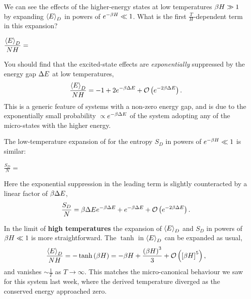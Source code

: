 \newpage %
We can see the effects of the higher-energy states at low temperatures $\beta H \gg 1$ by expanding $\left\langle E \right\rangle_D$ in powers of $e^{-\beta H} \ll 1$.
What is the first $\frac{T}{H}$-dependent term in this expansion?
\begin{mdframed}
  $\displaystyle \frac{\left\langle E \right\rangle_D}{NH} = $ \\[100 pt]
\end{mdframed}
You should find that the excited-state effects are \textit{exponentially} suppressed by the energy gap $\Delta E$ at low temperatures,
\begin{equation*}
  \frac{\left\langle E \right\rangle_D}{NH} = -1 + 2e^{-\beta \Delta E} + \mathcal O\left(e^{-2\beta \Delta E}\right).
\end{equation*}
This is a generic feature of systems with a non-zero energy gap, and is due to the exponentially small probability $\propto$$e^{-\beta \Delta E}$ of the system adopting any of the micro-states with the higher energy.

The low-temperature expansion of  for the entropy $S_D$ in powers of $e^{-\beta H} \ll 1$ is similar:
\begin{mdframed}
  $\displaystyle \frac{S_D}{N} = $ \\[100 pt]
\end{mdframed}
Here the exponential suppression in the leading term is slightly counteracted by a linear factor of $\beta \Delta E$,
\begin{equation*}
  \frac{S_D}{N} = \beta \Delta E e^{-\beta \Delta E} + e^{-\beta \Delta E} + \mathcal O\left(e^{-2\beta \Delta E}\right).
\end{equation*}

In the limit of \textbf{high temperatures} the expansion of $\left\langle E \right\rangle_D$ and $S_D$ in powers of $\beta H \ll 1$ is more straightforward.
The $\tanh$ in $\left\langle E \right\rangle_D$ can be expanded as usual,
\begin{equation*}
  \frac{\left\langle E \right\rangle_D}{NH} = -\tanh\left(\beta H\right) = -\beta H + \frac{\left(\beta H\right)^3}{3} + \mathcal O\left(\left[\beta H\right]^5\right),
\end{equation*}
and vanishes $\sim$$\frac{1}{T}$ as $T \to \infty$.
This matches the micro-canonical behaviour we saw for this system last week, where the derived temperature diverged as the conserved energy approached zero.


